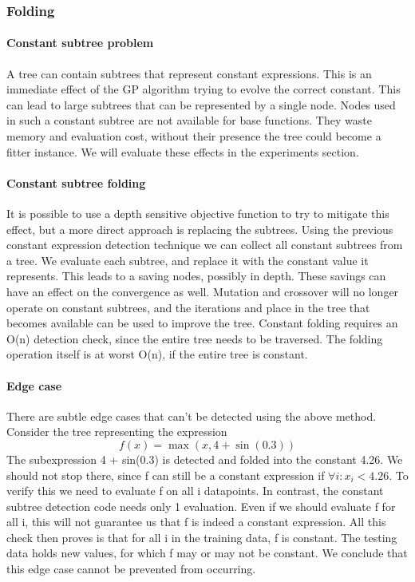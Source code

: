 \subsubsection{Folding}
\paragraph{Constant subtree problem}
A tree can contain subtrees that represent constant expressions. This is an immediate effect of the GP algorithm trying to evolve the correct constant. This can lead to large subtrees that can be represented by a single node. Nodes used in such a constant subtree are not available for base functions. They waste memory and evaluation cost, without their presence the tree could become a fitter instance. We will evaluate these effects in the experiments section.
\paragraph{Constant subtree folding}
It is possible to use a depth sensitive objective function to try to mitigate this effect, but a more direct approach is replacing the subtrees.
Using the previous constant expression detection technique we can collect all constant subtrees from a tree. We evaluate each subtree, and replace it with the constant value it represents. This leads to a saving nodes, possibly in depth. These savings can have an effect on the convergence as well. Mutation and crossover will no longer operate on constant subtrees, and the iterations and place in the tree that becomes available can be used to improve the tree.
Constant folding requires an O(n) detection check, since the entire tree needs to be traversed. The folding operation itself is at worst O(n), if the entire tree is constant.
\paragraph{Edge case}
There are subtle edge cases that can't be detected using the above method. Consider the tree representing the expression
\[
f(x) = \max(x, 4 + \sin(0.3)) 
\]
The subexpression 4 + sin(0.3) is detected and folded into the constant 4.26. 
We should not stop there, since f can still be a constant expression if $\forall i :  x_i < 4.26$. To verify this we need to evaluate f on all i datapoints. In contrast, the constant subtree detection code needs only 1 evaluation. Even if we should evaluate f for all i, this will not guarantee us that f is indeed a constant expression. All this check then proves is that for all i in the training data, f is constant. The testing data holds new values, for which f may or may not be constant. We conclude that this edge case cannot be prevented from occurring.
